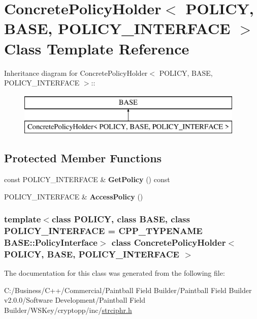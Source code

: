 \hypertarget{class_concrete_policy_holder}{
\section{ConcretePolicyHolder$<$ POLICY, BASE, POLICY\_\-INTERFACE $>$ Class Template Reference}
\label{class_concrete_policy_holder}
}
Inheritance diagram for ConcretePolicyHolder$<$ POLICY, BASE, POLICY\_\-INTERFACE $>$::\begin{figure}[H]
\begin{center}
\leavevmode
\includegraphics[height=2cm]{class_concrete_policy_holder}
\end{center}
\end{figure}
\subsection*{Protected Member Functions}
\begin{DoxyCompactItemize}
\item 
\hypertarget{class_concrete_policy_holder_a08d47d39ca49317f0543df68350aa8bf}{
const POLICY\_\-INTERFACE \& {\bfseries GetPolicy} () const }
\label{class_concrete_policy_holder_a08d47d39ca49317f0543df68350aa8bf}

\item 
\hypertarget{class_concrete_policy_holder_a1d90cb30eace971937cf02c0abafe6ea}{
POLICY\_\-INTERFACE \& {\bfseries AccessPolicy} ()}
\label{class_concrete_policy_holder_a1d90cb30eace971937cf02c0abafe6ea}

\end{DoxyCompactItemize}
\subsubsection*{template$<$class POLICY, class BASE, class POLICY\_\-INTERFACE = CPP\_\-TYPENAME BASE::PolicyInterface$>$ class ConcretePolicyHolder$<$ POLICY, BASE, POLICY\_\-INTERFACE $>$}



The documentation for this class was generated from the following file:\begin{DoxyCompactItemize}
\item 
C:/Business/C++/Commercial/Paintball Field Builder/Paintball Field Builder v2.0.0/Software Development/Paintball Field Builder/WSKey/cryptopp/inc/\hyperlink{strciphr_8h}{strciphr.h}\end{DoxyCompactItemize}
